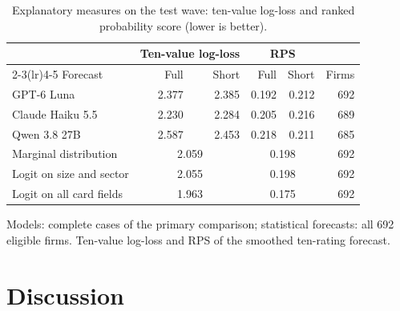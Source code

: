 \documentclass[11pt]{article}
\begin{document}
\begin{table}[ht]
\centering
\begin{threeparttable}
\caption{Explanatory measures on the test wave: ten-value log-loss and ranked probability score (lower is better).}
\label{tab:expl}
\small
\begin{tabular}{lrrrrr}
\toprule
 & \multicolumn{2}{c}{Ten-value log-loss} & \multicolumn{2}{c}{RPS} & \\
\cmidrule(lr){2-3}\cmidrule(lr){4-5}
Forecast & Full & Short & Full & Short & Firms\\
\midrule
GPT-6 Luna & 2.377 & 2.385 & 0.192 & 0.212 & 692\\
Claude Haiku 5.5 & 2.230 & 2.284 & 0.205 & 0.216 & 689\\
Qwen 3.8 27B & 2.587 & 2.453 & 0.218 & 0.211 & 685\\
\midrule
Marginal distribution & \multicolumn{2}{c}{2.059} & \multicolumn{2}{c}{0.198} & 692\\
Logit on size and sector & \multicolumn{2}{c}{2.055} & \multicolumn{2}{c}{0.198} & 692\\
Logit on all card fields & \multicolumn{2}{c}{1.963} & \multicolumn{2}{c}{0.175} & 692\\
\bottomrule
\end{tabular}
\begin{tablenotes}\footnotesize
\item Models: complete cases of the primary comparison; statistical forecasts: all 692 eligible firms. Ten-value
log-loss and RPS of the smoothed ten-rating forecast.
\end{tablenotes}
\end{threeparttable}
\end{table}

\section{Discussion}
\end{document}
